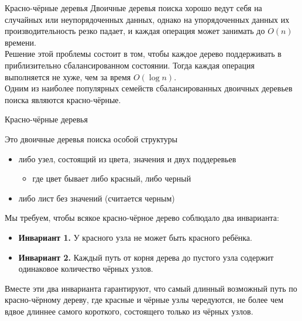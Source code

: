 \begin{frame}{Красно-чёрные деревья}
Двоичные деревья поиска хорошо ведут себя на случайных или неупорядоченных данных,
однако на упорядоченных данных их производительность резко падает, и
каждая операция может занимать до $O(n)$  времени. \\

 Решение этой
проблемы состоит в том, чтобы каждое дерево поддерживать в
приблизительно сбалансированном состоянии. Тогда каждая операция
выполняется не хуже, чем за время $O(\log n)$. \\

 Одним из наиболее
популярных семейств сбалансированных двоичных деревьев поиска являются
красно-чёрные.
\end{frame}

\begin{frame}[fragile]{}{Красно-чёрные деревья}

\begin{definition}
Это двоичные деревья поиска особой структуры
\begin{itemize}
\item либо узел, состоящий из цвета, значения и двух поддеревьев
\begin{itemize}
\item где цвет бывает либо красный, либо черный
\end{itemize}
\item либо лист без значений (считается черным)
\end{itemize}
\end{definition}
\vspace{1em}


Мы требуем, чтобы всякое красно-чёрное дерево соблюдало два
инварианта:
\begin{itemize}
  \item \textbf{Инвариант 1.} У красного узла не может быть красного ребёнка.
  \item \textbf{Инвариант 2.} Каждый путь от корня дерева до пустого
  узла содержит одинаковое количество чёрных узлов.
\end{itemize}
Вместе эти два инварианта гарантируют, что самый длинный возможный
путь по красно-чёрному дереву, где красные и чёрные узлы чередуются,
не более чем вдвое длиннее самого короткого, состоящего только из
чёрных узлов.

\end{frame}


